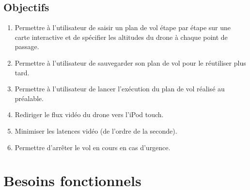 \documentclass{article}
\begin{document}
	\subsection{Objectifs}
		\begin{enumerate}
        	\item Permettre à l'utilisateur de saisir un plan de vol étape par étape sur une carte interactive et de spécifier les altitudes du drone à chaque point de passage.
        	\item Permettre à l'utilisateur de sauvegarder son plan de vol pour le réutiliser plus tard.
			\item Permettre à l'utilisateur de lancer l'exécution du plan de vol réalisé au préalable.
		 	\item Rediriger le flux vidéo du drone vers l'iPod touch. 
		 	\item Minimiser les latences vidéo (de l'ordre de la seconde).
		 	\item Permettre d'arrêter le vol en cours en cas d'urgence.
		\end{enumerate}
		
\section{Besoins fonctionnels}
\end{document}
